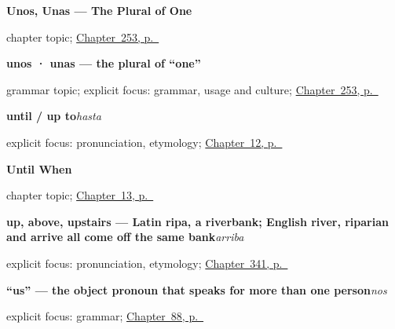 \noindent\begin{minipage}[t]{\linewidth}
\raggedright
\textbf{Unos, Unas --- The Plural of One}\par
\footnotesize chapter topic; \hyperref[ch:unos-unas]{Chapter~253, p.~\pageref*{ch:unos-unas}}
\end{minipage}\par\smallskip

\noindent\begin{minipage}[t]{\linewidth}
\raggedright
\textbf{unos · unas — the plural of \textquotedblleft{}one\textquotedblright{}}\par
\footnotesize grammar topic; explicit focus: grammar, usage and culture; \hyperref[ch:unos-unas]{Chapter~253, p.~\pageref*{ch:unos-unas}}
\end{minipage}\par\smallskip

\noindent\begin{minipage}[t]{\linewidth}
\raggedright
\textbf{until / up to}\enspace\emph{hasta}\par
\footnotesize explicit focus: pronunciation, etymology; \hyperref[ch:goodbye]{Chapter~12, p.~\pageref*{ch:goodbye}}
\end{minipage}\par\smallskip

\noindent\begin{minipage}[t]{\linewidth}
\raggedright
\textbf{Until When}\par
\footnotesize chapter topic; \hyperref[ch:until-when]{Chapter~13, p.~\pageref*{ch:until-when}}
\end{minipage}\par\smallskip

\noindent\begin{minipage}[t]{\linewidth}
\raggedright
\textbf{up, above, upstairs — Latin ripa, a riverbank; English river, riparian and arrive all come off the same bank}\enspace\emph{arriba}\par
\footnotesize explicit focus: pronunciation, etymology; \hyperref[ch:arriba-y-abajo]{Chapter~341, p.~\pageref*{ch:arriba-y-abajo}}
\end{minipage}\par\smallskip

\noindent\begin{minipage}[t]{\linewidth}
\raggedright
\textbf{\textquotedblleft{}us\textquotedblright{} — the object pronoun that speaks for more than one person}\enspace\emph{nos}\par
\footnotesize explicit focus: grammar; \hyperref[ch:pronoun-nos]{Chapter~88, p.~\pageref*{ch:pronoun-nos}}
\end{minipage}\par\smallskip

